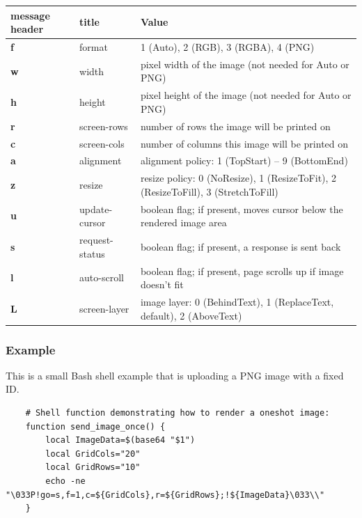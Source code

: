\documentclass[a4paper]{article}
\begin{document}
\begin{tabular}{|m{3cm}|m{2cm}|m{11cm}|}
    \hline
    \textbf{message header}   & \textbf{title}   & \textbf{Value} \\
    \hline
    \textbf{f} & format           & 1 (Auto), 2 (RGB), 3 (RGBA), 4 (PNG) \\
    \textbf{w} & width            & pixel width of the image (not needed for Auto or PNG) \\
    \textbf{h} & height           & pixel height of the image (not needed for Auto or PNG) \\
    \textbf{r} & screen-rows      & number of rows the image will be printed on \\
    \textbf{c} & screen-cols      & number of columns this image will be printed on \\
    \textbf{a} & alignment        & alignment policy: 1 (TopStart) -- 9 (BottomEnd) \\
    \textbf{z} & resize           & resize policy: 0 (NoResize), 1 (ResizeToFit), 2 (ResizeToFill), 3 (StretchToFill) \\
    \textbf{u} & update-cursor    & boolean flag; if present, moves cursor below the rendered image area \\
    \textbf{s} & request-status   & boolean flag; if present, a response is sent back \\
    \textbf{l} & auto-scroll      & boolean flag; if present, page scrolls up if image doesn't fit \\
    \textbf{L} & screen-layer     & image layer: 0 (BehindText), 1 (ReplaceText, default), 2 (AboveText) \\
    \hline
\end{tabular}

\subsubsection*{Example}

This is a small Bash shell example that is uploading a PNG image with a fixed ID.

\begin{verbatim}
    # Shell function demonstrating how to render a oneshot image:
    function send_image_once() {
        local ImageData=$(base64 "$1")
        local GridCols="20"
        local GridRows="10"
        echo -ne "\033P!go=s,f=1,c=${GridCols},r=${GridRows};!${ImageData}\033\\"
    }
\end{verbatim}
\end{document}
